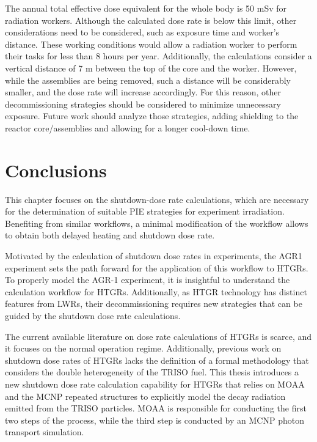 The annual total effective dose equivalent for the whole body is 50 mSv for radiation workers.
Although the calculated dose rate is below this limit, other considerations need to be considered, such as exposure time and worker's distance.
These working conditions would allow a radiation worker to perform their tasks for less than 8 hours per year.
Additionally, the calculations consider a vertical distance of 7 m between the top of the core and the worker.
However, while the assemblies are being removed, such a distance will be considerably smaller, and the dose rate will increase accordingly.
For this reason, other decommissioning strategies should be considered to minimize unnecessary exposure.
Future work should analyze those strategies, adding shielding to the reactor core/assemblies and allowing for a longer cool-down time.


\section{Conclusions}
\label{sec:conclusion}

This chapter focuses on the shutdown-dose rate calculations, which are necessary for the determination of suitable \gls*{PIE} strategies for experiment irradiation.
Benefiting from similar workflows, a minimal modification of the workflow allows to obtain both delayed heating and shutdown dose rate.

Motivated by the calculation of shutdown dose rates in experiments, the \gls*{AGR1} experiment sets the path forward for the application of this workflow to \glspl*{HTGR}.
To properly model the AGR-1 experiment, it is insightful to understand the calculation workflow for HTGRs.
Additionally, as \gls*{HTGR} technology has distinct features from \glspl*{LWR}, their decommissioning requires new strategies that can be guided by the shutdown dose rate calculations.

The current available literature on dose rate calculations of HTGRs is scarce, and it focuses on the normal operation regime.
Additionally, previous work on shutdown dose rates of HTGRs lacks the definition of a formal methodology that considers the double heterogeneity of the TRISO fuel.
This thesis introduces a new shutdown dose rate calculation capability for HTGRs that relies on MOAA and the MCNP repeated structures to explicitly model the decay radiation emitted from the TRISO particles.
MOAA is responsible for conducting the first two steps of the process, while the third step is conducted by an MCNP photon transport simulation.

